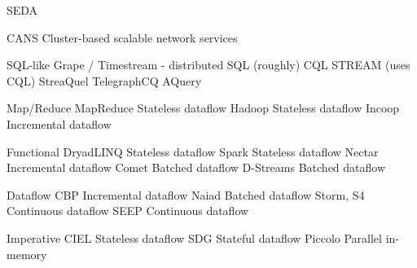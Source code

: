 SEDA

CANS Cluster-based scalable network services

SQL-like
  Grape / Timestream - distributed SQL (roughly)
  CQL
  STREAM (uses CQL)
  StreaQuel
  TelegraphCQ
  AQuery

Map/Reduce
  MapReduce    Stateless dataflow
  Hadoop       Stateless dataflow
  Incoop       Incremental dataflow

Functional
  DryadLINQ    Stateless dataflow
  Spark        Stateless dataflow
  Nectar       Incremental dataflow
  Comet        Batched dataflow
  D-Streams    Batched dataflow

Dataflow
  CBP          Incremental dataflow
  Naiad        Batched dataflow
  Storm, S4    Continuous dataflow
  SEEP         Continuous dataflow

Imperative
  CIEL         Stateless dataflow
  SDG          Stateful dataflow
  Piccolo      Parallel in-memory